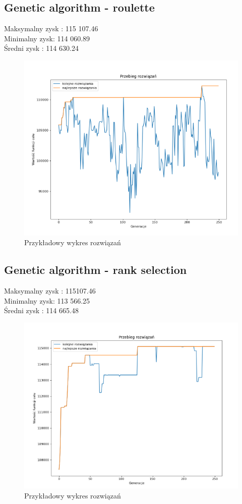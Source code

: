 \documentclass{article}
\begin{document}
\subsection{Genetic algorithm - roulette}
Maksymalny zysk : 115 107.46 \\
Minimalny zysk: 114 060.89 \\
Średni zysk : 114 630.24\\

\begin{figure}[H]
	\centering
	\includegraphics[width=0.7\linewidth]{screens/ruletka}
	\caption{Przykładowy wykres rozwiązań}
	\label{fig:ruletka}
\end{figure}



\subsection{Genetic algorithm - rank selection}
Maksymalny zysk : 115107.46\\
Minimalny zysk: 113 566.25 \\
Średni zysk : 114 665.48\\

\begin{figure}[H]
	\centering
	\includegraphics[width=0.7\linewidth]{screens/rank.png}
	\caption{Przykładowy wykres rozwiązań}
	\label{fig:rank}
\end{figure}
\end{document}
